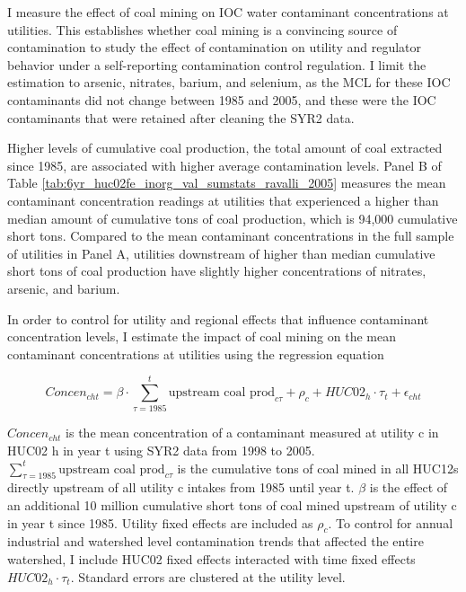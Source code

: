 \documentclass[12pt]{article}
\begin{document}
I measure the effect of coal mining on IOC water contaminant concentrations at utilities. This establishes whether coal mining is a convincing source of contamination to study the effect of contamination on utility and regulator behavior under a self-reporting contamination control regulation. I limit the estimation to arsenic, nitrates, barium, and selenium, as the MCL for these IOC contaminants did not change between 1985 and 2005, and these were the IOC contaminants that were retained after cleaning the SYR2 data.

Higher levels of cumulative coal production, the total amount of coal extracted since 1985, are associated with higher average contamination levels. Panel B of Table \ref{tab:6yr_huc02fe_inorg_val_sumstats_ravalli_2005} measures the mean contaminant concentration readings at utilities that experienced a higher than median amount of cumulative tons of coal production, which is 94,000 cumulative short tons. Compared to the mean contaminant concentrations in the full sample of utilities in Panel A, utilities downstream of higher than median cumulative short tons of coal production have slightly higher concentrations of nitrates, arsenic, and barium.

In order to control for utility and regional effects that influence contaminant concentration levels, I estimate the impact of coal mining on the mean contaminant concentrations at utilities using the regression equation

\begin{equation}\label{eq:huc02reg}
    \textit{Concen}_{cht}= \beta\cdot\sum_{\tau=1985}^t\text{upstream coal prod}_{c\tau}  + \rho_c + HUC02_h\cdot\tau_t + \epsilon_{cht}
\end{equation}

$\textit{Concen}_{cht}$ is the mean concentration of a contaminant measured at utility c in HUC02 h in year t using SYR2 data from 1998 to 2005. $\sum_{\tau=1985}^t\text{upstream coal prod}_{c\tau}$ is the cumulative tons of coal mined in all HUC12s directly upstream of all utility c intakes from 1985 until year t. $\beta$ is the effect of an additional 10 million cumulative short tons of coal mined upstream of utility c in year t since 1985. Utility fixed effects are included as $\rho_c$. To control for annual industrial and watershed level contamination trends that affected the entire watershed, I include HUC02 fixed effects interacted with time fixed effects $HUC02_h\cdot\tau_t$. Standard errors are clustered at the utility level.
\end{document}

